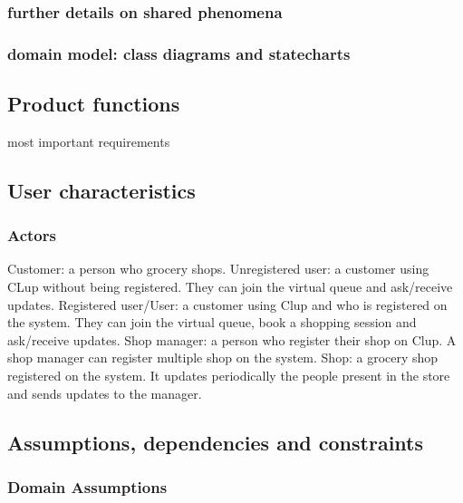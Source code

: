 \subsubsection{further details on shared phenomena}
\subsubsection{domain model: class diagrams and statecharts}
\subsection{Product functions}
most important requirements
\subsection{User characteristics}
\subsubsection{Actors}
Customer: a person who grocery shops.
Unregistered user: a customer using CLup without being registered. They can join the virtual queue and ask/receive updates.
Registered user/User: a customer using Clup and who is registered on the system. They can join the virtual queue, book a shopping session and ask/receive updates.
Shop manager: a person who register their shop on Clup. A shop manager can register multiple shop on the system.
Shop: a grocery shop registered on the system. It updates periodically the people present in the store and sends updates to the manager.

\subsection{Assumptions, dependencies and constraints}
\subsubsection{Domain Assumptions}

